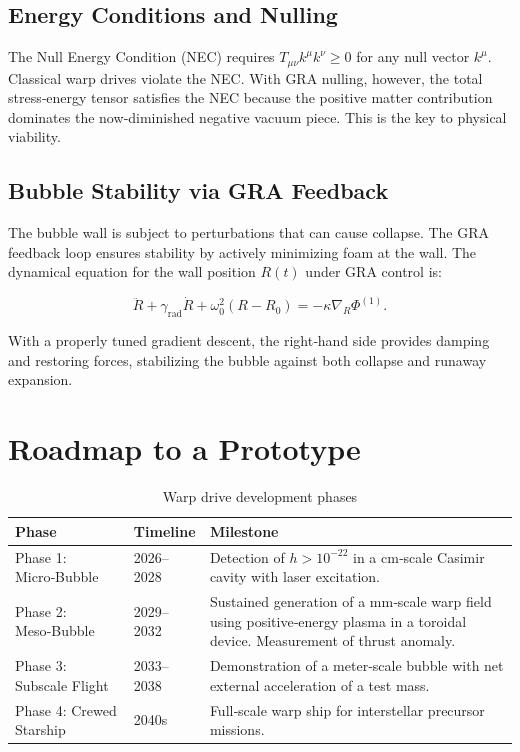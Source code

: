 \documentclass[11pt]{article}
\begin{document}
\subsection{Energy Conditions and Nulling}

The Null Energy Condition (NEC) requires $T_{\mu\nu} k^\mu k^\nu \ge 0$ for any null vector $k^\mu$. Classical warp drives violate the NEC. With GRA nulling, however, the total stress‑energy tensor satisfies the NEC because the positive matter contribution dominates the now‑diminished negative vacuum piece. This is the key to physical viability.

\subsection{Bubble Stability via GRA Feedback}

The bubble wall is subject to perturbations that can cause collapse. The GRA feedback loop ensures stability by actively minimizing foam at the wall. The dynamical equation for the wall position $R(t)$ under GRA control is:

\begin{equation}
\ddot{R} + \gamma_{\text{rad}} \dot{R} + \omega_0^2 (R - R_0) = - \kappa \nabla_R \Phi^{(1)}.
\label{eq:stability}
\end{equation}

With a properly tuned gradient descent, the right‑hand side provides damping and restoring forces, stabilizing the bubble against both collapse and runaway expansion.

\section{Roadmap to a Prototype}

\begin{table}[h]
\centering
\caption{Warp drive development phases}
\label{tab:roadmap}
\begin{tabular}{@{}lll@{}}
\toprule
\textbf{Phase} & \textbf{Timeline} & \textbf{Milestone} \\
\midrule
Phase 1: Micro‑Bubble & 2026--2028 & Detection of $h > 10^{-22}$ in a cm‑scale Casimir cavity with laser excitation. \\
Phase 2: Meso‑Bubble & 2029--2032 & Sustained generation of a mm‑scale warp field using positive‑energy plasma in a toroidal device. Measurement of thrust anomaly. \\
Phase 3: Subscale Flight & 2033--2038 & Demonstration of a meter‑scale bubble with net external acceleration of a test mass. \\
Phase 4: Crewed Starship & 2040s & Full‑scale warp ship for interstellar precursor missions. \\
\bottomrule
\end{tabular}
\end{table}
\end{document}
